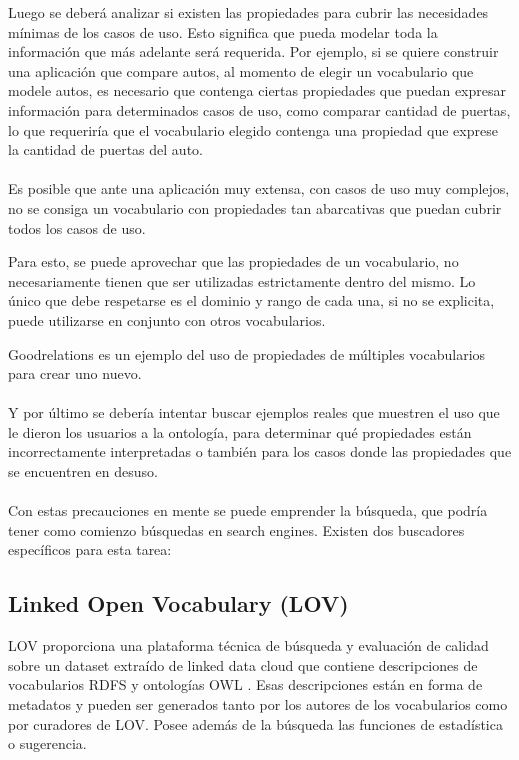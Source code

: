 \noindent Luego se deberá analizar si existen las propiedades para cubrir las necesidades mínimas de los casos de uso. Esto significa que pueda modelar 
toda la información que más adelante será requerida. Por ejemplo, si se quiere construir una aplicación que compare autos, al momento 
de elegir un vocabulario que modele autos, es necesario que contenga ciertas propiedades que puedan expresar información  para determinados 
casos de uso, como comparar cantidad de puertas, lo que requeriría que el vocabulario elegido contenga una propiedad que exprese la cantidad 
de puertas del auto.
\\\\
Es posible que ante una aplicación muy extensa, con casos de uso muy complejos, no se consiga un vocabulario con propiedades tan abarcativas 
que puedan cubrir todos los casos de uso. 

Para esto, se puede aprovechar que las propiedades de un vocabulario, no necesariamente tienen que ser utilizadas estrictamente dentro del mismo.
Lo único que debe respetarse es el dominio y rango de cada una, si no se explicita, puede utilizarse en conjunto con otros vocabularios.

Goodrelations\cite{Hepp2008} es un ejemplo del uso de propiedades de múltiples vocabularios para crear uno nuevo.
\\\\
Y por último se debería intentar buscar ejemplos reales que muestren el uso que le dieron los usuarios a la ontología, para 
determinar qué propiedades están incorrectamente interpretadas o también para los casos donde las propiedades que se encuentren 
en desuso.
\\\\
Con estas precauciones en mente se puede emprender la búsqueda, que podría tener como comienzo búsquedas en  search engines. 
Existen dos buscadores específicos para esta tarea:

\subsection{Linked Open Vocabulary (LOV)}

LOV proporciona una plataforma técnica de búsqueda y evaluación de calidad sobre un dataset extraído de linked data cloud que contiene descripciones de vocabularios RDFS 
y ontologías OWL \cite{Vandenbussche2012}. Esas descripciones están en forma de metadatos y pueden ser generados tanto por los autores de los vocabularios como por curadores de LOV.
Posee además de la búsqueda las funciones de estadística o sugerencia.

